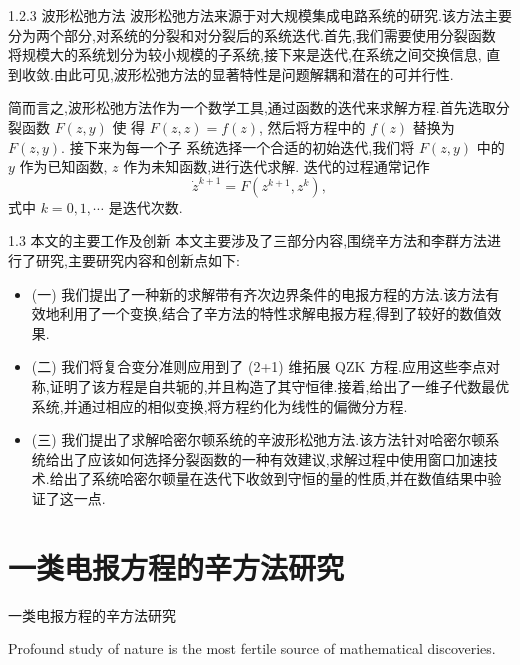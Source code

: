 \documentclass{beamer}
\begin{document}
\begin{frame}{1.2.3 波形松弛方法}
\qquad 波形松弛方法来源于对大规模集成电路系统的研究.该方法主要分为两个部分,对系统的分裂和对分裂后的系统迭代.首先,我们需要使用分裂函数
 将规模大的系统划分为较小规模的子系统,接下来是迭代,在系统之间交换信息,
直到收敛.由此可见,波形松弛方法的显著特性是问题解耦和潜在的可并行性.

\qquad 简而言之,波形松弛方法作为一个数学工具,通过函数的迭代来求解方程.首先选取分裂函数 $F(z,y)$ 使
得 $F(z,z)=f(z)$, 然后将方程中的 $f(z)$ 替换为 $F(z,y)$. 接下来为每一个子
系统选择一个合适的初始迭代,我们将 $F(z,y)$ 中的 $y$ 作为已知函数, $z$ 作为未知函数,进行迭代求解.
迭代的过程通常记作 $$\dot{z}^{k+1}=F(z^{k+1},z^{k}),$$ 式中 $k=0,1,\cdots$ 是迭代次数.
\end{frame}

\begin{frame}{1.3 本文的主要工作及创新}
\qquad 本文主要涉及了三部分内容,围绕辛方法和李群方法进行了研究,主要研究内容和创新点如下:

\begin{itemize}
\item (一) 我们提出了一种新的求解带有齐次边界条件的电报方程的方法.该方法有效地利用了一个变换,结合了辛方法的特性求解电报方程,得到了较好的数值效果.

\item (二) 我们将复合变分准则应用到了 (2+1) 维拓展 QZK 方程.应用这些李点对称,证明了该方程是自共轭的,并且构造了其守恒律.接着,给出了一维子代数最优系统,并通过相应的相似变换,将方程约化为线性的偏微分方程.

\item (三) 我们提出了求解哈密尔顿系统的辛波形松弛方法.该方法针对哈密尔顿系统给出了应该如何选择分裂函数的一种有效建议,求解过程中使用窗口加速技术.给出了系统哈密尔顿量在迭代下收敛到守恒的量的性质,并在数值结果中验证了这一点.
\end{itemize}
\end{frame}

\section{一类电报方程的辛方法研究}
\begin{frame}{一类电报方程的辛方法研究}
\begin{exampleblock}{}
\qquad Profound study of nature is the most fertile source of mathematical discoveries.\\
\end{exampleblock}
\end{frame}
\end{document}
